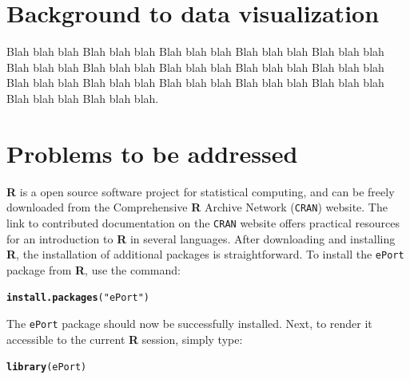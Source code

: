 \documentclass[11pt,a4paper,oldfontcommands,openany]{memoir}
\makeatletter
\newcommand{\hlstr}[1]{\textcolor[rgb]{0.192,0.494,0.8}{#1}}%
\newcommand{\hlstd}[1]{\textcolor[rgb]{0.345,0.345,0.345}{#1}}%
\newcommand{\hlkwd}[1]{\textcolor[rgb]{0.737,0.353,0.396}{\textbf{#1}}}%
\newenvironment{kframe}{%
 \def\at@end@of@kframe{}%
 \ifinner\ifhmode%
  \def\at@end@of@kframe{\end{minipage}}%
  \begin{minipage}{\columnwidth}%
 \fi\fi%
 \def\FrameCommand##1{\hskip\@totalleftmargin \hskip-\fboxsep
 \colorbox{shadecolor}{##1}\hskip-\fboxsep
     \hskip-\linewidth \hskip-\@totalleftmargin \hskip\columnwidth}%
 \MakeFramed {\advance\hsize-\width
   \@totalleftmargin\z@ \linewidth\hsize
   \@setminipage}}%
 {\par\unskip\endMakeFramed%
 \at@end@of@kframe}
\newenvironment{knitrout}{}{} %
\numberwithin{equation}{section} %
\newcommand{\pkg}[1]{{\texttt{#1}}}
\makeatother
\begin{document}
\section{Background to data visualization}

Blah blah blah Blah blah blah Blah blah blah Blah blah blah Blah blah blah Blah blah blah Blah blah blah Blah blah blah Blah blah blah Blah blah blah Blah blah blah Blah blah blah Blah blah blah Blah blah blah Blah blah blah Blah blah blah Blah blah blah.

\section{Problems to be addressed}

\textbf{\textsf{R}} is a open source software project for statistical computing, and can be freely downloaded from the Comprehensive \textbf{\textsf{R}} Archive Network (\texttt{CRAN}) website. The link to contributed documentation on the \texttt{CRAN} website offers practical resources for an introduction to \textbf{\textsf{R}} in several languages. After downloading and installing \textbf{\textsf{R}}, the installation of additional packages is straightforward. To install the \pkg{ePort} package from \textbf{\textsf{R}}, use the command: \\

\begin{knitrout}
\color{fgcolor}\begin{kframe}
\begin{alltt}
\hlkwd{install.packages}\hlstd{(}\hlstr{"ePort"}\hlstd{)}
\end{alltt}
\end{kframe}
\end{knitrout}

\noindent
The \pkg{ePort} package should now be successfully installed. Next, to render it accessible to the current \textbf{\textsf{R}} session, simply type: \\

\begin{knitrout}
\color{fgcolor}\begin{kframe}
\begin{alltt}
\hlkwd{library}\hlstd{(ePort)}
\end{alltt}
\end{kframe}
\end{knitrout}
\end{document}
